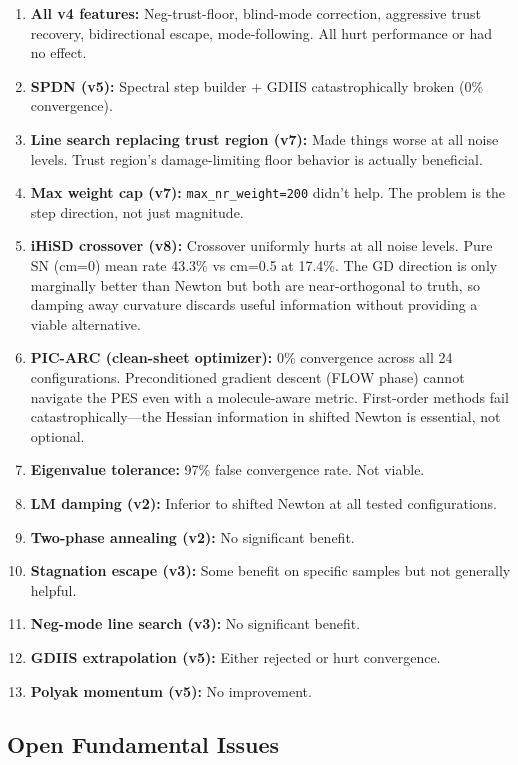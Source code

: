 \documentclass[11pt,a4paper]{article}
\begin{document}
\begin{enumerate}
  \item \textbf{All v4 features:} Neg-trust-floor, blind-mode correction, aggressive trust recovery, bidirectional escape, mode-following. All hurt performance or had no effect.
  \item \textbf{SPDN (v5):} Spectral step builder + GDIIS catastrophically broken (0\% convergence).
  \item \textbf{Line search replacing trust region (v7):} Made things worse at all noise levels. Trust region's damage-limiting floor behavior is actually beneficial.
  \item \textbf{Max weight cap (v7):} \texttt{max\_nr\_weight=200} didn't help. The problem is the step direction, not just magnitude.
  \item \textbf{iHiSD crossover (v8):} Crossover uniformly hurts at all noise levels. Pure SN (cm=0) mean rate 43.3\% vs cm=0.5 at 17.4\%. The GD direction is only marginally better than Newton but both are near-orthogonal to truth, so damping away curvature discards useful information without providing a viable alternative.
  \item \textbf{PIC-ARC (clean-sheet optimizer):} 0\% convergence across all 24 configurations. Preconditioned gradient descent (FLOW phase) cannot navigate the PES even with a molecule-aware metric. First-order methods fail catastrophically---the Hessian information in shifted Newton is essential, not optional.
  \item \textbf{Eigenvalue tolerance:} 97\% false convergence rate. Not viable.
  \item \textbf{LM damping (v2):} Inferior to shifted Newton at all tested configurations.
  \item \textbf{Two-phase annealing (v2):} No significant benefit.
  \item \textbf{Stagnation escape (v3):} Some benefit on specific samples but not generally helpful.
  \item \textbf{Neg-mode line search (v3):} No significant benefit.
  \item \textbf{GDIIS extrapolation (v5):} Either rejected or hurt convergence.
  \item \textbf{Polyak momentum (v5):} No improvement.
\end{enumerate}

\subsection{Open Fundamental Issues}
\end{document}

